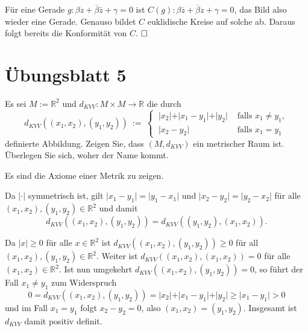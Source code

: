 \documentclass[11pt]{book}
\numberwithin{dummy}{section}
\theoremstyle{nonumberbreak}
\newenvironment{prob}[1][]{\ifthenelse{\equal{#1}{}}{\problem}{\problem[#1]}\rm}{\endproblem}
\newenvironment{sol}[1][]{\ifthenelse{\equal{#1}{}}{\solution}{\solution[#1]}\rm}{\endsolution}
\newcommand{\R}{\mathbb{R}}
\newcommand{\la}{\longrightarrow}
\begin{document}
\begin{spacing}{1.4}
\begin{prob}
\begin{sol}
\begin{compactenum}
\item Für eine Gerade $g: \beta z + \overline{\beta}\overline{z} + \gamma=0$ ist $C(g):\beta \overline{z} +  \overline{\beta} z + \gamma=0$, das Bild also wieder eine Gerade. Genauso bildet $C$ euklidische Kreise auf solche ab. Daraus folgt bereits die Konformität von $C$. $\hfill \Box$

\end{compactenum}

\end{sol}

\end{prob}







\newpage




\titlespacing*{\section}{-16.5pt}{0pt}{20pt}
\renewcommand*\thesection{}
\section{Übungsblatt 5} %
\renewcommand*\thesection{\arabic{section}}



\begin{prob}   %
Es sei $M:=\R^2$ und $d_{KVV}:M \times M \la \R$ die durch 
$$d_{KVV}((x_1,x_2),(y_1,y_2))  \ := \ \begin{cases} \ \vert x_2\vert + \vert x_1-y_1\vert + \vert y_2\vert & \textrm{ falls } x_1 \neq y_1, \\ \ \vert x_2 - y_2\vert & \textrm{ falls }x_1 = y_1 \end{cases}$$
definierte Abbildung.
Zeigen Sie, dass $(M,d_{KVV})$ ein metrischer Raum ist. Überlegen Sie sich, woher der Name kommt.

\begin{sol}Es sind die Axiome einer Metrik zu zeigen.
\begin{compactenum}
\item Da $\vert \cdot \vert$ symmetrisch ist, gilt $\vert x_1-y_1\vert = \vert y_1 - x_1\vert$ und $\vert x_2 - y_2 \vert = \vert y_2 - x_2\vert$ für alle $(x_1,x_2), (y_1,y_2) \in \R^2$ und damit
$$d_{KVV}((x_1,x_2),(y_1,y_2)) = d_{KVV}((y_1,y_2),(x_1,x_2)).$$
\item Da $\vert x\vert \geqslant 0$ für alle $x\in \R^2$ ist $d_{KVV}((x_1,x_2),(y_1,y_2)) \geqslant 0$ für all $(x_1,x_2), (y_1,y_2) \in \R^2$. Weiter ist $d_{KVV}((x_1,x_2),(x_1,x_2)) = 0$ für alle $(x_1,x_2) \in \R^2$. Ist nun umgekehrt $d_{KVV}((x_1,x_2),(y_1,y_2))=0$, so führt der Fall $x_1 \neq y_1$ zum Widerspruch $$0=d_{KVV}((x_1,x_2),(y_1,y_2))=\vert x_2\vert + \vert x_1-y_1\vert+\vert y_2\vert \geqslant \vert x_1-y_1\vert >0$$ und im Fall $x_1=y_1$ folgt $x_2-y_2=0$, also $(x_1,x_2)=(y_1,y_2)$. Insgesamt ist $d_{KVV}$ damit positiv definit.


\end{compactenum}
\end{sol}
\end{prob}
\end{spacing}
\end{document}
